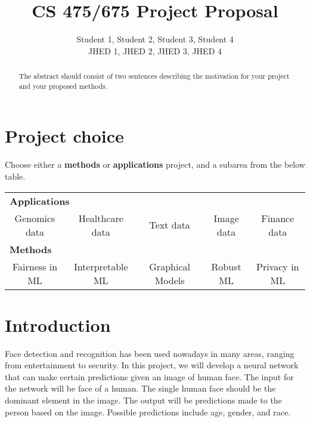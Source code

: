 \documentclass{article}
\title{CS 475/675 Project Proposal}
\author{
  Student 1, Student 2, Student 3, Student 4\\
  JHED 1, JHED 2, JHED 3, JHED 4
}
\newcommand{\Checked}{{\LARGE \XBox}}%
\newcommand{\Unchecked}{{\LARGE \Square}}%
\begin{document}
\maketitle

\begin{abstract}
The abstract should consist of two sentences describing the motivation for your project and your proposed methods.
\end{abstract}

\section{Project choice}

Choose either a {\bf methods} or {\bf applications} project, and a subarea from the below table.
\begin{table}[!h]
\centering
\def\arraystretch{2}
\begin{tabular}{c c c c c }
\toprule
\multicolumn{5}{l}{\Checked \bf Applications} \\
\Unchecked Genomics data & 
\Unchecked Healthcare data & 
\Unchecked Text data &
\Checked Image data &
\Unchecked Finance data \\
\midrule
\multicolumn{5}{l}{\Unchecked \bf Methods} \\
\Unchecked Fairness in ML &
\Unchecked Interpretable ML &
\Unchecked Graphical Models &
\Unchecked Robust ML &
\Unchecked Privacy in ML \\
\bottomrule
\end{tabular}
\end{table}

\section{Introduction}	
Face detection and recognition has been used nowadays in many areas, ranging from entertainment to security. In this project, we will develop a neural network that can make certain predictions given an image of human face. The input for the network will be face of a human. The single human face should be the dominant element in the image. The output will be predictions made to the person based on the image. Possible predictions include age, gender, and race.
\end{document}
